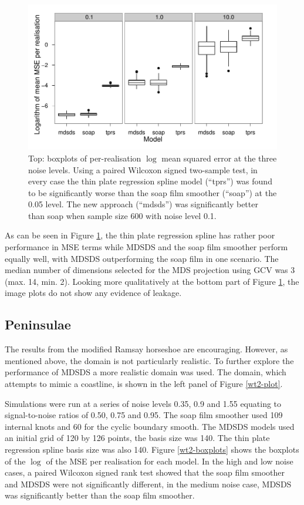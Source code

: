\documentclass[useAMS, referee]{biom}
\begin{document}
\begin{figure}
\centering
\includegraphics[width=\textwidth]{examples/ramsay/ramsay-result.pdf}
\caption{Top: boxplots of per-realisation $\log$ mean squared error at the three noise levels. Using a paired Wilcoxon signed two-sample test, in every case the thin plate regression spline model (``tprs'') was found to be significantly worse than the soap film smoother (``soap'') at the 0.05 level. The new approach (``mdsds'') was significantly better than soap when sample size 600 with noise level 0.1.}
\label{ramsay-results}
\end{figure}

As can be seen in Figure \ref{ramsay-results}, the thin plate regression spline has rather poor performance in MSE terms while MDSDS and the soap film smoother perform equally well, with MDSDS outperforming the soap film in one scenario. The median number of dimensions selected for the MDS projection using GCV was 3 (max. 14, min. 2). Looking more qualitatively at the bottom part of Figure \ref{ramsay-results}, the image plots do not show any evidence of leakage.

\subsection{Peninsulae}

The results from the modified Ramsay horseshoe are encouraging. However, as mentioned above, the domain is not particularly realistic. To further explore the performance of MDSDS a more realistic domain was used. The domain, which attempts to mimic a coastline, is shown in the left panel of Figure \ref{wt2-plot}.

Simulations were run at a series of noise levels 0.35, 0.9 and 1.55 equating to signal-to-noise ratios of 0.50, 0.75 and 0.95. The soap film smoother used 109 internal knots and 60 for the cyclic boundary smooth. The MDSDS models used an initial grid of 120 by 126 points, the basis size was 140. The thin plate regression spline basis size was also 140. Figure \ref{wt2-boxplots} shows the boxplots of the $\log$ of the MSE per realisation for each model. In the high and low noise cases, a paired Wilcoxon signed rank test showed that the soap film smoother and MDSDS were not significantly different, in the medium noise case, MDSDS was significantly better than the soap film smoother.
\end{document}
